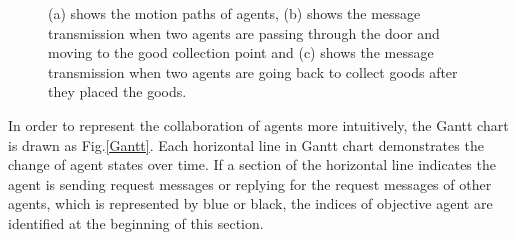 \documentclass[journal]{IEEEtran}
\begin{document}
\begin{figure}
\centering
{}
\hspace{0.02cm}
\hspace{0.02cm}
\caption{(a) shows the motion paths of agents, (b) shows the message transmission when two agents are passing through the door and moving to the good collection point and (c) shows the message transmission when two agents are going back to collect goods after they placed the goods.}
\label{second}
\end{figure}
In order to represent the collaboration of agents more intuitively, the Gantt chart is drawn as Fig.\ref{Gantt}. Each horizontal line in Gantt chart demonstrates the change of agent states over time. If a section of the horizontal line indicates the agent is sending request messages or replying for the request messages of other agents, which is represented by blue or black, the indices of objective agent are identified at the beginning of this section.
\end{document}
